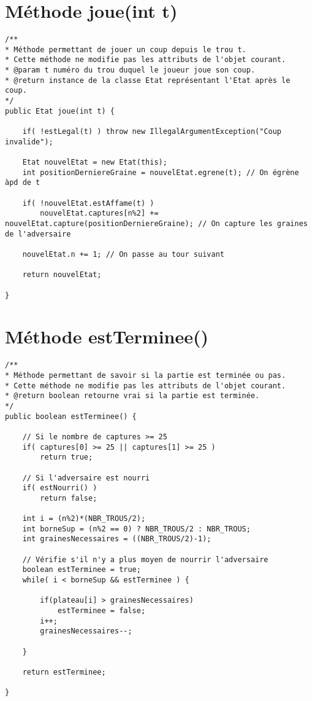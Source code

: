 \documentclass[11pt,a4paper]{report}
\begin{document}
\section{Méthode joue(int t)}
\begin{lstlisting}
/**
* Méthode permettant de jouer un coup depuis le trou t.
* Cette méthode ne modifie pas les attributs de l'objet courant.
* @param t numéro du trou duquel le joueur joue son coup.
* @return instance de la classe Etat représentant l'Etat après le coup.
*/
public Etat joue(int t) {

    if( !estLegal(t) ) throw new IllegalArgumentException("Coup invalide");

    Etat nouvelEtat = new Etat(this);
    int positionDerniereGraine = nouvelEtat.egrene(t); // On égrène àpd de t

    if( !nouvelEtat.estAffame(t) )
        nouvelEtat.captures[n%2] += nouvelEtat.capture(positionDerniereGraine); // On capture les graines de l'adversaire

    nouvelEtat.n += 1; // On passe au tour suivant

    return nouvelEtat;

}
\end{lstlisting}

\newpage

\section{Méthode estTerminee()}
\begin{lstlisting}
/**
* Méthode permettant de savoir si la partie est terminée ou pas.
* Cette méthode ne modifie pas les attributs de l'objet courant.
* @return boolean retourne vrai si la partie est terminée.
*/
public boolean estTerminee() {

    // Si le nombre de captures >= 25
    if( captures[0] >= 25 || captures[1] >= 25 )
        return true;

    // Si l'adversaire est nourri
    if( estNourri() )
        return false;

    int i = (n%2)*(NBR_TROUS/2);
    int borneSup = (n%2 == 0) ? NBR_TROUS/2 : NBR_TROUS;
    int grainesNecessaires = ((NBR_TROUS/2)-1);

    // Vérifie s'il n'y a plus moyen de nourrir l'adversaire
    boolean estTerminee = true;
    while( i < borneSup && estTerminee ) {

        if(plateau[i] > grainesNecessaires)
            estTerminee = false;
        i++;
        grainesNecessaires--;

    }

    return estTerminee;

}
\end{lstlisting}
\end{document}
